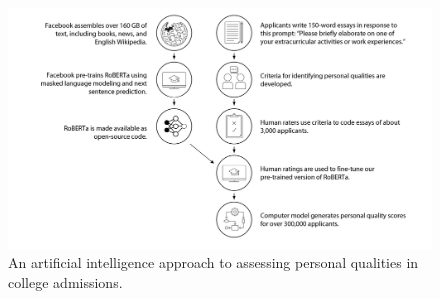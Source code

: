 \documentclass[11pt]{report}
\begin{document}
\begin{mainf}
\begin{figure}[ht]
    \centering
    \includegraphics[width= \textwidth]{fig1_new2_scale.pdf}
    \caption{An artificial intelligence approach to assessing personal qualities in college admissions.}
    \label{fig:f1}
\end{figure}


\end{mainf}
\end{document}
